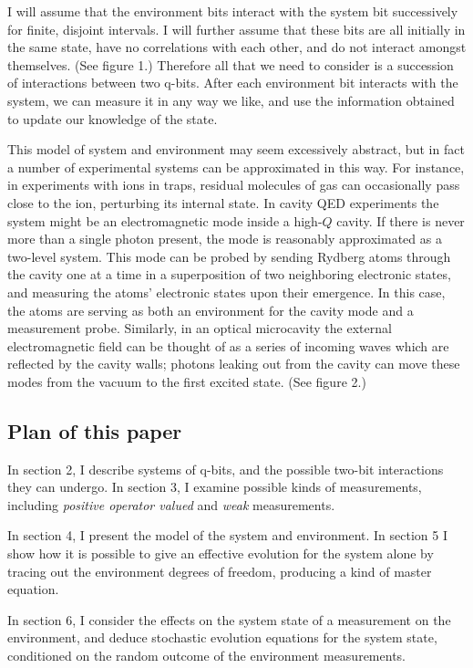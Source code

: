 I will assume that the environment bits interact
with the system bit successively for finite, disjoint intervals.
I will further assume that these bits
are all initially in the same state, have no correlations with each other,
and do not interact amongst themselves.  (See figure 1.)  Therefore all
that we need to consider is a succession of interactions between two q-bits.
After each environment bit interacts with the system, we can measure it
in any way we like, and use the information obtained to update our
knowledge of the state.

This model of system and environment may seem excessively abstract,
but in fact a number of experimental systems can be approximated in this
way.  For instance, in experiments with ions in traps, residual molecules
of gas can occasionally pass close to the ion, perturbing its internal
state.  In cavity QED experiments the system might be an electromagnetic
mode inside a high-$Q$ cavity.  If there is never more than a single
photon present, the mode is reasonably approximated as a two-level system.
This mode can be probed by sending Rydberg atoms through the cavity one at
a time in a superposition of two neighboring electronic states,
and measuring the atoms' electronic states upon their emergence.  In this
case, the atoms are serving as both an environment for the cavity mode
and a measurement probe.  Similarly, in an optical microcavity the
external electromagnetic field can be thought of as a series of incoming
waves which are reflected by the cavity walls; photons leaking out from the
cavity can move these modes from the vacuum to the first excited state.
(See figure 2.)

\subsection{Plan of this paper}

In section 2, I describe systems of q-bits, and the possible
two-bit interactions they can undergo.  In section 3, I examine possible
kinds of measurements, including {\it positive operator valued} and
{\it weak} measurements.

In section 4, I present the model of the system and environment.  In
section 5 I show how it is possible to give an effective evolution
for the system alone by tracing out the environment degrees of freedom,
producing a kind of master equation.

In section 6, I consider the effects on the system state of a measurement on
the environment, and deduce stochastic evolution equations for the system
state, conditioned on the random outcome of the environment measurements.

